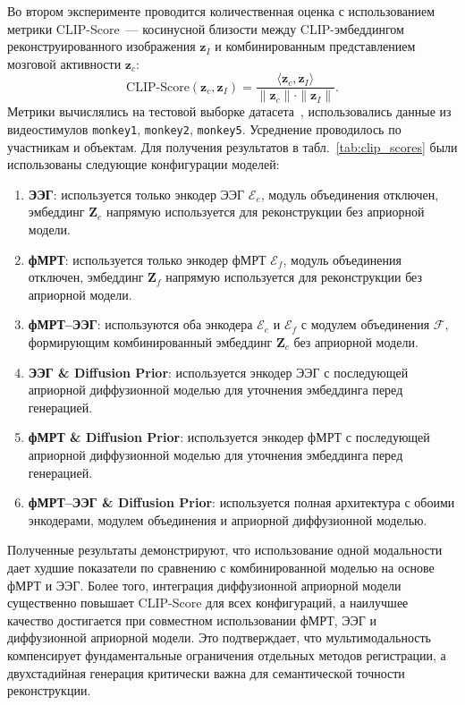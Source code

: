 Во втором эксперименте проводится количественная оценка с использованием метрики CLIP-Score~--- косинусной близости между CLIP-эмбеддингом реконструированного изображения $\mathbf{z}_I$ и комбинированным представлением мозговой активности $\mathbf{z}_c$:
\begin{equation}\label{eq:clip_score}
    \text{CLIP-Score}(\mathbf{z}_c, \mathbf{z}_I) = \frac{\langle \mathbf{z}_c, \mathbf{z}_I \rangle}{\| \mathbf{z}_c \| \cdot \| \mathbf{z}_I \|}.
\end{equation}
Метрики вычислялись на тестовой выборке датасета~\cite{Telesford2023}, использовались данные из видеостимулов \texttt{monkey1}, \texttt{monkey2}, \texttt{monkey5}. Усреднение проводилось по участникам и объектам. Для получения результатов в табл.~\ref{tab:clip_scores} были использованы следующие конфигурации моделей:
\begin{enumerate}
    \item \textbf{ЭЭГ}: используется только энкодер ЭЭГ $\mathcal{E}_e$, модуль объединения отключен, эмбеддинг $\mathbf{Z}_e$ напрямую используется для реконструкции без априорной модели.
    \item \textbf{фМРТ}: используется только энкодер фМРТ $\mathcal{E}_f$, модуль объединения отключен, эмбеддинг $\mathbf{Z}_f$ напрямую используется для реконструкции без априорной модели.
    \item \textbf{фМРТ--ЭЭГ}: используются оба энкодера $\mathcal{E}_e$ и $\mathcal{E}_f$ с модулем объединения $\mathcal{F}$, формирующим комбинированный эмбеддинг $\mathbf{Z}_c$ без априорной модели.
    \item \textbf{ЭЭГ \& Diffusion Prior}: используется энкодер ЭЭГ с последующей априорной диффузионной моделью для уточнения эмбеддинга перед генерацией.
    \item \textbf{фМРТ \& Diffusion Prior}: используется энкодер фМРТ с последующей априорной диффузионной моделью для уточнения эмбеддинга перед генерацией.
    \item \textbf{фМРТ--ЭЭГ \& Diffusion Prior}: используется полная архитектура с обоими энкодерами, модулем объединения и априорной диффузионной моделью.
\end{enumerate}

Полученные результаты демонстрируют, что использование одной модальности дает худшие показатели по сравнению с комбинированной моделью на основе фМРТ и ЭЭГ. Более того, интеграция диффузионной априорной модели существенно повышает CLIP-Score для всех конфигураций, а наилучшее качество достигается при совместном использовании фМРТ, ЭЭГ и диффузионной априорной модели. Это подтверждает, что мультимодальность компенсирует фундаментальные ограничения отдельных методов регистрации, а двухстадийная генерация критически важна для семантической точности реконструкции.

